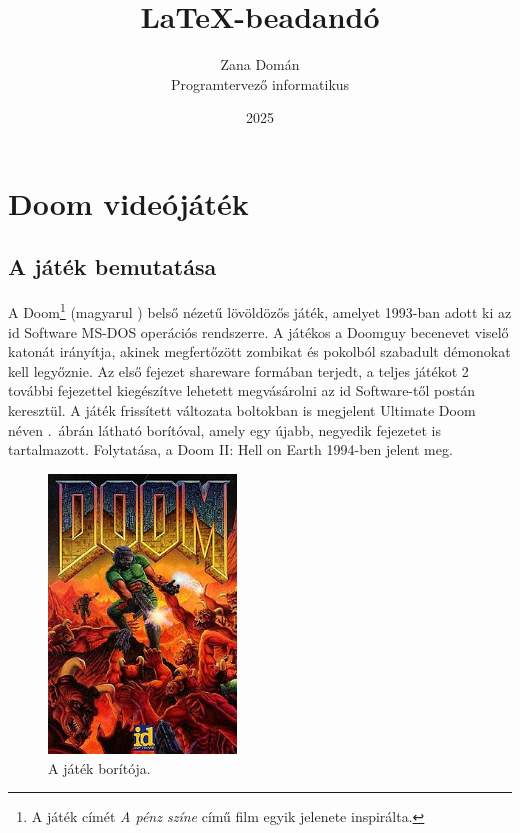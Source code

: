 \documentclass{thesis-ekf}
\theoremstyle{definition}
\begin{document}
\title{\LaTeX-beadandó}
\author{Zana Domán\\Programtervező informatikus}
\date{2025}
\maketitle

\tableofcontents

\chapter{Doom videójáték}

\section{A játék bemutatása}

A Doom\footnote{A játék címét \emph{A pénz színe} című film egyik jelenete
inspirálta.} (magyarul ) belső nézetű lövöldözős játék, amelyet
1993-ban adott ki az id Software MS-DOS operációs rendszerre. A játékos a
Doomguy becenevet viselő katonát irányítja, akinek megfertőzött zombikat és
pokolból szabadult démonokat kell legyőznie. Az első fejezet shareware formában
terjedt, a teljes játékot 2 további fejezettel kiegészítve lehetett megvásárolni
az id Software-től postán keresztül. A játék frissített változata boltokban is
megjelent Ultimate Doom néven .~ábrán látható borítóval, amely
egy újabb, negyedik fejezetet is tartalmazott. Folytatása, a Doom II: Hell on
Earth 1994-ben jelent meg. \cite[Bevezető]{doomgame}

\begin{figure}[h]
    \centering
    \includegraphics[width=5cm]{doom.jpg}
    \caption{A játék borítója.}
    \label{fig:borito}
\end{figure}
\end{document}
